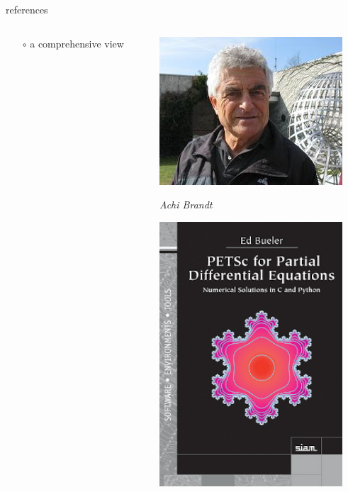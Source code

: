 \documentclass[10pt,
               svgnames,
               hyperref={colorlinks,citecolor=DeepPink4,linkcolor=FireBrick,urlcolor=Maroon},
               usepdftitle=false]{beamer}
\begin{document}
\begin{frame}{references}
\begin{columns}
\begin{column}{0.8\textwidth}
\begin{itemize}
\begin{itemize}
    \item[$\circ$] a comprehensive view
    \end{itemize}
\end{itemize}
\end{column}
\begin{column}{0.17\textwidth}
\hfill \includegraphics[width=\textwidth]{images/abrandt.jpg}

\hfill {\scriptsize \emph{Achi Brandt}}

\vspace{7mm}
\hfill \includegraphics[width=0.9\textwidth]{images/bueler.jpg}


\end{column}
\end{columns}
\end{frame}
\end{document}
